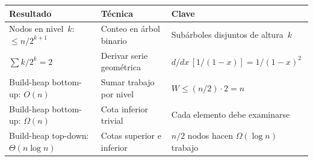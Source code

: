 \documentclass[11pt, letterpaper]{article}
\theoremstyle{definition}
\theoremstyle{plain}
\theoremstyle{remark}
\begin{document}
\begin{table}[h]
\centering
\begin{tabular}{llp{5.5cm}}
\toprule
\textbf{Resultado} & \textbf{Técnica} & \textbf{Clave} \\
\midrule
Nodos en nivel~$k$: $\leq n/2^{k+1}$
  & Conteo en árbol binario
  & Subárboles disjuntos de altura~$k$ \\
$\sum k/2^k = 2$
  & Derivar serie geométrica
  & $d/dx\,[1/(1{-}x)] = 1/(1{-}x)^2$ \\
Build-heap bottom-up: $O(n)$
  & Sumar trabajo por nivel
  & $W \leq (n/2) \cdot 2 = n$ \\
Build-heap bottom-up: $\Omega(n)$
  & Cota inferior trivial
  & Cada elemento debe examinarse \\
Build-heap top-down: $\Theta(n \log n)$
  & Cotas superior e inferior
  & $n/2$ nodos hacen $\Omega(\log n)$ trabajo \\
\bottomrule
\end{tabular}
\end{table}
\end{document}

